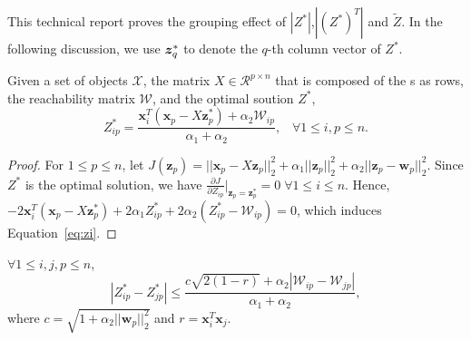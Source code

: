 

This technical report proves the grouping effect of $|Z^*|$,$|(Z^*)^T|$ and $\tilde{Z}$.
In the following discussion, we use ${\bm z}_q^*$ to denote the $q$-th column vector of $Z^*$.

\begin{lemma}
\label{lemma1}
Given a set of objects $\mathcal{X}$,
the matrix
$X\in \mathcal{R}^{p\times n}$ that is composed of the {\pev}s as rows,
 the reachability matrix $\mathcal{W}$,
 and the optimal soution $Z^*$,
\begin{equation}
\label{eq:zi}
Z_{ip}^* = \frac{\bm{x}_i^T(\bm{x}_p-X\bm{z}_p^*) + \alpha_2 \mathcal{W}_{ip}}{\alpha_1+\alpha_2}, \;\;\; \forall 1 \leq i, p \leq n.
\end{equation}
\end{lemma}

\begin{proof}
For $1 \leq p \leq n$,
let $J(\bm{z}_p) =  ||\bm{x}_p-X\bm{z}_p||_2^2 + \alpha_1 ||\bm{z}_p||_2^2 + \alpha_2 ||\bm{z}_p-\bm{w}_p||_2^2$.
Since $Z^*$ is the optimal solution, we have $\frac{\partial{J}}{\partial{Z}_{ip}}|_{\bm{z}_p = \bm{z}_p^*} = 0\; \forall 1\leq i \leq n$.
Hence, $-2\bm{x}_i^T(\bm{x}_p-X\bm{z}_p^*)+2\alpha_1Z_{ip}^*+2\alpha_2(Z_{ip}^*-\mathcal{W}_{ip}) = 0$,
which induces Equation~\ref{eq:zi}.
\end{proof}

\begin{lemma}
\label{lemma2}
$\forall 1 \leq i, j, p \leq n$,
\begin{equation}
\label{eq:norm}
|Z_{ip}^*-Z_{jp}^*| \leq \frac{c\sqrt{2(1-r)} + \alpha_2|\mathcal{W}_{ip}-\mathcal{W}_{jp}|}{\alpha_1+\alpha_2},
\end{equation}
where $c = \sqrt{1+\alpha_2||\bm{w}_p||_2^2}$ and $r = \bm{x}_i^T\bm{x}_j$.
\end{lemma}

